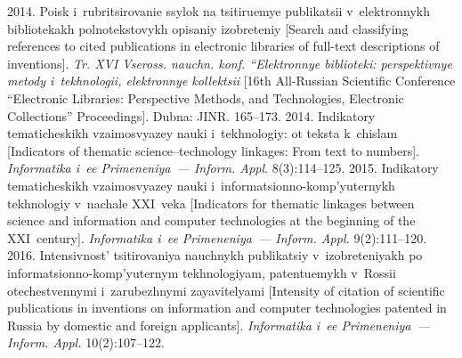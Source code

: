 \begin{multicols}{2}
{{\begin{thebibliography}{99}
 2014. Poisk 
i~rubritsirovanie ssylok na tsitiruemye publikatsii v~elektronnykh 
bibliotekakh polnotekstovykh opisaniy izobreteniy [Search and classifying 
references to cited publications in electronic libraries of full-text descriptions 
of inventions]. \textit{Tr. XVI Vseross. nauchn. konf.  
``Elektronnye biblioteki: perspektivnye metody i~tekhnologii, elektronnye 
kollektsii} [16th All-Russian Scientific Conference ``Electronic 
Libraries: Perspective Methods, and Technologies, Electronic Collections'' 
Proceedings]. Dubna: JINR. 165--173.
 2014. Indikatory tematicheskikh vzaimosvyazey nauki 
i~tekhnologiy: ot teksta k~chislam [Indicators of 
thematic science--technology linkages: From text to numbers]. \textit{Informatika i~ee 
Primeneniya~--- Inform. Appl}. 8(3):114--125.
 2015. Indikatory tematicheskikh vzaimosvyazey nauki  
i~informatsionno-komp'yuternykh tekhnologiy v~nachale XXI~veka 
[Indicators for thematic linkages between science and information and
computer technologies at the beginning of the XXI~century]. 
\textit{Informatika i~ee Primeneniya~--- Inform. Appl.} 9(2):111--120.
 2016. Intensivnost' tsitirovaniya nauchnykh publikatsiy 
v~izobreteniyakh po informatsionno-komp'yuternym tekhnologiyam, 
patentuemykh v~Rossii otechestvennymi i~zarubezhnymi zayavitelyami 
[Intensity of citation of scientific publications in inventions on information and
computer technologies patented 
in Russia by domestic and foreign applicants]. \textit{Informatika i~ee  
Primeneniya~--- Inform. Appl.} 10(2):107--122.



\end{thebibliography}}}
\end{multicols}
